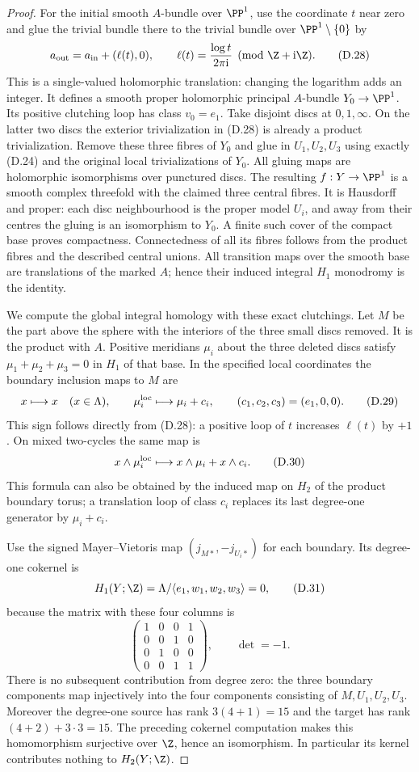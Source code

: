 \begin{proof}
For the initial smooth $A$-bundle over $\PP^1$, use the
coordinate $t$ near zero and glue the trivial bundle there
to the trivial bundle over $\PP^1\setminus\{0\}$ by
\[
 a_{\rm out}=a_{\rm in}+(\ell(t),0),
 \qquad \ell(t)=\frac{\log t}{2\pi\mathrm i}\pmod{\Z+\mathrm i\Z}.
\tag{D.28}
\]
This is a single-valued holomorphic translation: changing
the logarithm adds an integer. It defines a smooth proper
holomorphic principal $A$-bundle $Y_0\to\PP^1$.
Its positive clutching loop has class $v_0=e_1$.
Take disjoint discs at $0,1,\infty$. On the latter two
discs the exterior trivialization in (D.28) is already a
product trivialization. Remove these three fibres of $Y_0$
and glue in $U_1,U_2,U_3$ using exactly (D.24) and the
original local trivializations of $Y_0$. All gluing maps
are holomorphic isomorphisms over punctured discs. The
resulting $f:Y\to\PP^1$ is a smooth complex threefold with
the claimed three central fibres. It is Hausdorff and
proper: each disc neighbourhood is the proper model $U_i$,
and away from their centres the gluing is an isomorphism
to $Y_0$. A finite such cover of the compact base proves
compactness. Connectedness of all its fibres follows
from the product fibres and the described central unions.
All transition maps over the smooth base are translations
of the marked $A$; hence their induced integral $H_1$
monodromy is the identity.

We compute the global integral homology with these exact
clutchings. Let $M$ be the part above the sphere with the
interiors of the three small discs removed. It is the
product with $A$. Positive meridians $\mu_i$ about the
three deleted discs satisfy
$\mu_1+\mu_2+\mu_3=0$ in $H_1$ of that base. In the
specified local coordinates the boundary inclusion maps
to $M$ are
\[
 x\longmapsto x\quad(x\in\Lambda),\qquad
 \mu_i^{\rm loc}\longmapsto\mu_i+c_i,
 \qquad(c_1,c_2,c_3)=(e_1,0,0).
\tag{D.29}
\]
This sign follows directly from (D.28): a positive loop
of $t$ increases $\ell(t)$ by $+1$. On mixed
two-cycles the same map is
\[
 x\wedge\mu_i^{\rm loc}
       \longmapsto x\wedge\mu_i+x\wedge c_i.
\tag{D.30}
\]
This formula can also be obtained by the induced map on
$H_2$ of the product boundary torus; a translation loop
of class $c_i$ replaces its last degree-one generator
by $\mu_i+c_i$.

Use the signed Mayer--Vietoris map
$(j_{M*},-j_{U_i*})$ for each boundary. Its degree-one
cokernel is
\[
 H_1(Y;\Z)=
 \Lambda/\langle e_1,w_1,w_2,w_3\rangle=0,
\tag{D.31}
\]
because the matrix with these four columns is
\[
 \begin{pmatrix}
 1&0&0&1\\0&0&1&0\\0&1&0&0\\0&0&1&1
 \end{pmatrix},\qquad\det=-1.
\]
There is no subsequent contribution from degree zero:
the three boundary components map injectively into the
four components consisting of $M,U_1,U_2,U_3$.
Moreover the degree-one source has rank $3(4+1)=15$
and the target has rank $(4+2)+3\cdot3=15$.
The preceding cokernel computation makes this homomorphism
surjective over $\Z$, hence an isomorphism. In particular
its kernel contributes nothing to $H_2(Y;\Z)$.


\end{proof}
